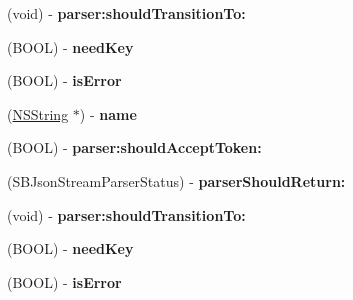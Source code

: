 \begin{DoxyCompactItemize}
\item 
\hypertarget{interface_s_b_json_stream_parser_state_a5ed454a903b6bd268f1c1b373e243013}{
(void) -\/ {\bfseries parser\-:should\-Transition\-To\-:}}
\label{interface_s_b_json_stream_parser_state_a5ed454a903b6bd268f1c1b373e243013}

\item 
\hypertarget{interface_s_b_json_stream_parser_state_aab97dd88c338d285cc9aca7f21875ae1}{
(\-B\-O\-O\-L) -\/ {\bfseries need\-Key}}
\label{interface_s_b_json_stream_parser_state_aab97dd88c338d285cc9aca7f21875ae1}

\item 
\hypertarget{interface_s_b_json_stream_parser_state_a8d04c21bcd093e5817bdbff30f39ba46}{
(\-B\-O\-O\-L) -\/ {\bfseries is\-Error}}
\label{interface_s_b_json_stream_parser_state_a8d04c21bcd093e5817bdbff30f39ba46}

\item 
\hypertarget{interface_s_b_json_stream_parser_state_a1402b44a4570d855268f758d5999e8f2}{
(\hyperlink{class_n_s_string}{\-N\-S\-String} $\ast$) -\/ {\bfseries name}}
\label{interface_s_b_json_stream_parser_state_a1402b44a4570d855268f758d5999e8f2}

\item 
\hypertarget{interface_s_b_json_stream_parser_state_a4c82e9be435d6f393bf5a0467c1e83eb}{
(\-B\-O\-O\-L) -\/ {\bfseries parser\-:should\-Accept\-Token\-:}}
\label{interface_s_b_json_stream_parser_state_a4c82e9be435d6f393bf5a0467c1e83eb}

\item 
\hypertarget{interface_s_b_json_stream_parser_state_a7ba884f572ebae244fd252055aed25fc}{
(\-S\-B\-Json\-Stream\-Parser\-Status) -\/ {\bfseries parser\-Should\-Return\-:}}
\label{interface_s_b_json_stream_parser_state_a7ba884f572ebae244fd252055aed25fc}

\item 
\hypertarget{interface_s_b_json_stream_parser_state_a5ed454a903b6bd268f1c1b373e243013}{
(void) -\/ {\bfseries parser\-:should\-Transition\-To\-:}}
\label{interface_s_b_json_stream_parser_state_a5ed454a903b6bd268f1c1b373e243013}

\item 
\hypertarget{interface_s_b_json_stream_parser_state_aab97dd88c338d285cc9aca7f21875ae1}{
(\-B\-O\-O\-L) -\/ {\bfseries need\-Key}}
\label{interface_s_b_json_stream_parser_state_aab97dd88c338d285cc9aca7f21875ae1}

\item 
\hypertarget{interface_s_b_json_stream_parser_state_a8d04c21bcd093e5817bdbff30f39ba46}{
(\-B\-O\-O\-L) -\/ {\bfseries is\-Error}}
\label{interface_s_b_json_stream_parser_state_a8d04c21bcd093e5817bdbff30f39ba46}


\end{DoxyCompactItemize}
